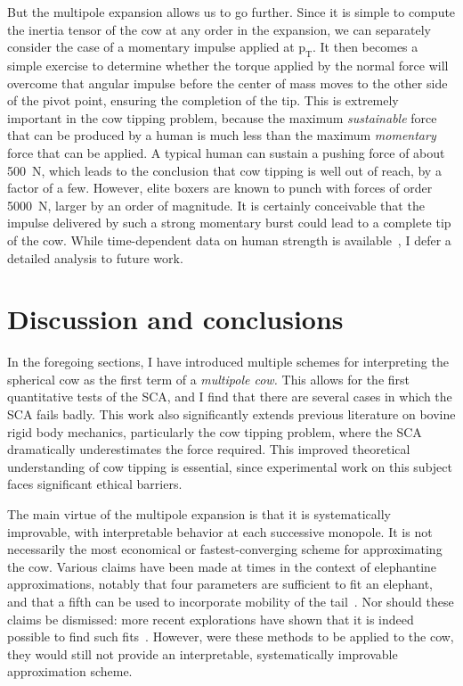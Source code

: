 \documentclass[
    prd, twocolumn, nofootinbib, amsmath, amssymb,
    aps, floatfix, preprintnumbers
]{revtex4-2}
\newcommand{\bb}[1]{\bm{\mathrm{#1}}}
\begin{document}
But the multipole expansion allows us to go further. Since it is simple to compute the inertia tensor of the cow at any order in the expansion, we can separately consider the case of a momentary impulse applied at $\bb p_{\mathrm{T}}$. It then becomes a simple exercise to determine whether the torque applied by the normal force will overcome that angular impulse before the center of mass moves to the other side of the pivot point, ensuring the completion of the tip. This is extremely important in the cow tipping problem, because the maximum \emph{sustainable} force that can be produced by a human is much less than the maximum \emph{momentary} force that can be applied. A typical human can sustain a pushing force of about \qty{500}{\newton}, which leads to the conclusion that cow tipping is well out of reach, by a factor of a few. However, elite boxers are known to punch with forces of order \qty{5000}{\newton}, larger by an order of magnitude. It is certainly conceivable that the impulse delivered by such a strong momentary burst could lead to a complete tip of the cow. While time-dependent data on human strength is available~\cite{nasa}, I defer a detailed analysis to future work.



\section{Discussion and conclusions}
\label{sec:discussion}
In the foregoing sections, I have introduced multiple schemes for interpreting the spherical cow as the first term of a \emph{multipole cow.} This allows for the first quantitative tests of the SCA, and I find that there are several cases in which the SCA fails badly. This work also significantly extends previous literature on bovine rigid body mechanics, particularly the cow tipping problem, where the SCA dramatically underestimates the force required. This improved theoretical understanding of cow tipping is essential, since experimental work on this subject faces significant ethical barriers.

The main virtue of the multipole expansion is that it is systematically improvable, with interpretable behavior at each successive monopole. It is not necessarily the most economical or fastest-converging scheme for approximating the cow. Various claims have been made at times in the context of elephantine approximations, notably that four parameters are sufficient to fit an elephant, and that a fifth can be used to incorporate mobility of the tail~\cite{Dyson:2004}. Nor should these claims be dismissed: more recent explorations have shown that it is indeed possible to find such fits~\cite{Jin:2024}. However, were these methods to be applied to the cow, they would still not provide an interpretable, systematically improvable approximation scheme.
\end{document}
